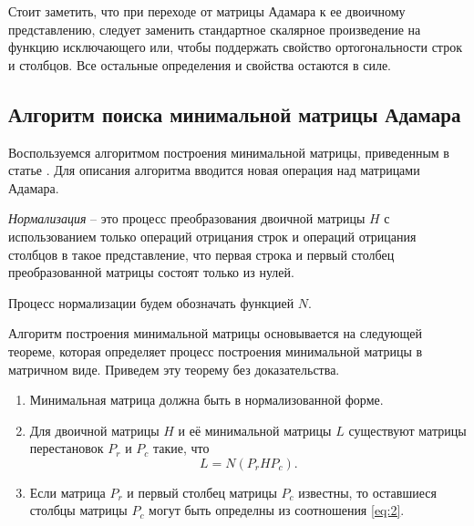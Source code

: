 \documentclass[a4paper, 14pt]{extreport}
\begin{document}
Стоит заметить, что при переходе от матрицы Адамара к ее двоичному представлению, следует заменить стандартное скалярное произведение на функцию исключающего или, чтобы поддержать свойство ортогональности строк и столбцов. Все остальные определения и свойства остаются в силе.

\subsection{Алгоритм поиска минимальной матрицы Адамара}
\label{mm_finder_th}

Воспользуемся алгоритмом построения минимальной матрицы, приведенным в статье \cite{park_song:he}. Для описания алгоритма вводится новая операция над матрицами Адамара.

\begin{Df}[Нормализация]\normalfont\label{df:norm}
    {\it Нормализация} -- это процесс преобразования двоичной матрицы $H$ с использованием только операций отрицания строк и операций отрицания столбцов в такое представление, что первая строка и первый столбец преобразованной матрицы состоят только из нулей.
\end{Df}

Процесс нормализации будем обозначать функцией $N$.

Алгоритм построения минимальной матрицы основывается на следующей теореме, которая определяет процесс построения минимальной матрицы в матричном виде. Приведем эту теорему без доказательства.

\begin{Th}\normalfont\label{th:mm_algo}
    \begin{enumerate}
        \item Минимальная матрица должна быть в нормализованной форме.
        \item Для двоичной матрицы $H$ и её минимальной матрицы $L$ существуют матрицы перестановок $P_r$ и $P_c$ такие, что
            \begin{equation}\label{eq:2}
                L = N(P_r H P_c).
            \end{equation}
        \item Если матрица $P_r$ и первый столбец матрицы $P_c$ известны, то оставшиеся столбцы матрицы $P_c$ могут быть определны из соотношения \ref{eq:2}.
    \end{enumerate}
\end{Th}
\end{document}
